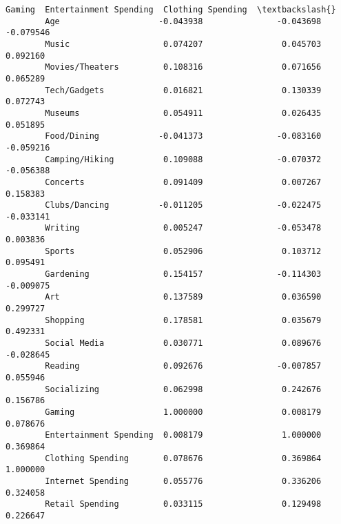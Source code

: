 \documentclass[11pt]{article}
\begin{document}
\begin{Verbatim}[commandchars=\\\{\}]
                                  Gaming  Entertainment Spending  Clothing Spending  \textbackslash{}
        Age                    -0.043938               -0.043698          -0.079546   
        Music                   0.074207                0.045703           0.092160   
        Movies/Theaters         0.108316                0.071656           0.065289   
        Tech/Gadgets            0.016821                0.130339           0.072743   
        Museums                 0.054911                0.026435           0.051895   
        Food/Dining            -0.041373               -0.083160          -0.059216   
        Camping/Hiking          0.109088               -0.070372          -0.056388   
        Concerts                0.091409                0.007267           0.158383   
        Clubs/Dancing          -0.011205               -0.022475          -0.033141   
        Writing                 0.005247               -0.053478           0.003836   
        Sports                  0.052906                0.103712           0.095491   
        Gardening               0.154157               -0.114303          -0.009075   
        Art                     0.137589                0.036590           0.299727   
        Shopping                0.178581                0.035679           0.492331   
        Social Media            0.030771                0.089676          -0.028645   
        Reading                 0.092676               -0.007857           0.055946   
        Socializing             0.062998                0.242676           0.156786   
        Gaming                  1.000000                0.008179           0.078676   
        Entertainment Spending  0.008179                1.000000           0.369864   
        Clothing Spending       0.078676                0.369864           1.000000   
        Internet Spending       0.055776                0.336206           0.324058   
        Retail Spending         0.033115                0.129498           0.226647   
        

\end{Verbatim}
\end{document}
